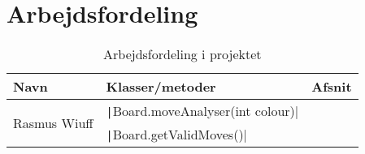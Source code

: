 \appendix
\appendixpage
\addappheadtotoc
\section{Arbejdsfordeling}\label{sec:arbejde}
\begin{table}[H]
    \centering
    \caption{Arbejdsfordeling i projektet}\label{tbl:arbejde}
    \begin{tabular}{lll}
        \toprule
        Navn                          & Klasser/metoder                                   & Afsnit \\
        \midrule
        \multirow{2}{*}{Rasmus Wiuff} & \texttt|Board.moveAnalyser(int colour)| &        \\
                                      & \texttt|Board.getValidMoves()|          &        \\
        \bottomrule
    \end{tabular}
\end{table}